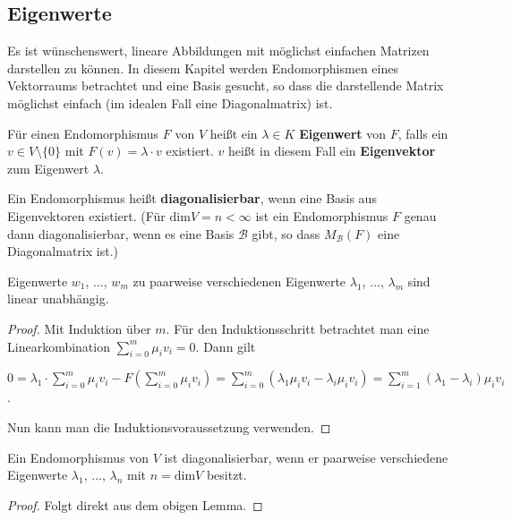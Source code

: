 \subsection{Eigenwerte}
Es ist wünschenswert, lineare Abbildungen mit möglichst einfachen Matrizen
darstellen zu können. In diesem Kapitel werden Endomorphismen eines Vektorraums
betrachtet und eine Basis gesucht, so dass die darstellende Matrix möglichst
einfach (im idealen Fall eine Diagonalmatrix) ist.

\begin{definition} Für einen Endomorphismus $F$  von $V$ heißt ein $\lambda \in
K$ \textbf{Eigenwert} von $F$, falls ein $v \in V \setminus \{ 0 \}$ mit $F(v) =
\lambda \cdot v$ existiert. $v$ heißt in diesem Fall ein \textbf{Eigenvektor}
zum Eigenwert $\lambda$.
\end{definition}

\begin{definition} Ein Endomorphismus heißt \textbf{diagonalisierbar}, wenn eine
Basis aus Eigenvektoren existiert. (Für $\text{dim}V = n < \infty$ ist ein
Endomorphismus $F$ genau dann diagonalisierbar, wenn es eine Basis $\mathcal{B}$
gibt, so dass  $M_{\mathcal{B}}(F)$ eine Diagonalmatrix ist.)
\end{definition}

\begin{lemma} Eigenwerte $w_1$, $\ldots$, $w_m$ zu paarweise verschiedenen
Eigenwerte $\lambda_1$, $\ldots$, $\lambda_m$ sind linear unabhängig.
\end{lemma}
\begin{proof}
Mit Induktion über $m$. Für den Induktionsschritt betrachtet man eine
Linearkombination $\sum_{i=0}^m \mu_i v_i = 0$. Dann gilt
\begin{center}
$0 = \lambda_1 \cdot \sum_{i=0}^m \mu_i v_i - F\left( \sum_{i=0}^m \mu_i v_i
\right) = \sum_{i=0}^m (\lambda_1 \mu_i v_i-\lambda_i \mu_i v_i) =
\sum_{i=1}^m (\lambda_1 - \lambda_i) \mu_i v_i$.
\end{center}
Nun kann man die Induktionsvoraussetzung verwenden.
\end{proof}

\begin{satz} Ein Endomorphismus von $V$ ist diagonalisierbar, wenn er paarweise
verschiedene Eigenwerte $\lambda_1$, $\ldots$, $\lambda_n$ mit $n = \text{dim}
V$ besitzt.
\end{satz}
\begin{proof}
Folgt direkt aus dem obigen Lemma.
\end{proof}

